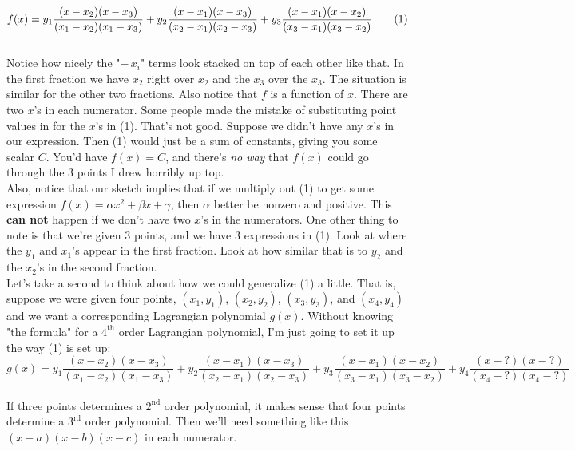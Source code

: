 \documentclass{article}
\newcommand\numberthis{\addtocounter{equation}{1}\tag{\theequation}}
\def\a{\alpha}
\def\b{\beta}
\def\c{\gamma}
\begin{document}
\[
f(x)  = y_1 \frac{(x - x_2)(x - x_3)}{(x_1 - x_2)(x_1 - x_3)} + y_2 \frac{(x - x_1)(x - x_3)}{(x_2 - x_1)(x_2 - x_3)} + y_3 \frac{(x - x_1)(x - x_2)}{(x_3 - x_1)(x_3 - x_2)} \numberthis
\] \\

Notice how nicely the "$ - \, x_i $" terms look stacked on top of each other like that. In the first fraction we have $x_2$ right over $x_2$ and the $x_3$ over the $x_3$. The situation is similar for the other two fractions. Also notice that $f$ is a function of $x$. There are two $x$'s in each numerator. Some people made the mistake of substituting point values in for the $x$'s in (1). That's not good. Suppose we didn't have any $x$'s in our expression. Then (1) would just be a sum of constants, giving you some scalar $C$.  You'd have $f(x) = C$, and there's \textit{no way} that $f(x)$ could go through the 3 points I drew horribly up top. \\

Also, notice that our sketch implies that if we multiply out (1) to get some expression $f(x) = \a x^2 + \b x + \c$, then $\a$ better be nonzero and positive. This \textbf{can not} happen if we don't have two $x$'s in the numerators. One other thing to note is that we're given 3 points, and we have 3 expressions in (1). Look at where the $y_1$ and $x_1$'s appear in the first fraction. Look at how similar that is to $y_2$ and the $x_2$'s in the second fraction. \\

Let's take a second to think about how we could generalize (1) a little. That is, suppose we were given four points, $(x_1, y_1)$, $(x_2, y_2)$, $(x_3, y_3)$, and $(x_4, y_4)$ and we want a corresponding Lagrangian polynomial $g(x)$. Without knowing "the formula" for a $4^\text{th}$ order Lagrangian polynomial, I'm just going to set it up the way (1) is set up: \\

\[
g(x)  = y_1 \frac{(x - x_2)(x - x_3)}{(x_1 - x_2)(x_1 - x_3)} + y_2 \frac{(x - x_1)(x - x_3)}{(x_2 - x_1)(x_2 - x_3)} + y_3 \frac{(x - x_1)(x - x_2)}{(x_3 - x_1)(x_3 - x_2)}  + y_4 \frac{(x - ?)(x - ?)}{(x_4 - ?)(x_4 - ?)} 
\] \\

If three points determines a $2^\text{nd}$ order polynomial, it makes sense that four points determine a $3^\text{rd}$ order polynomial. Then we'll need something like this $(x - a)(x- b)(x-c)$ in each numerator. \\
\end{document}
